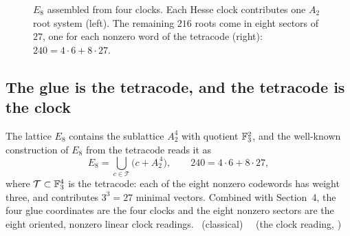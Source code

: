 \begin{figure}[htbp]
\centering
{}
\caption{$E_8$ assembled from four clocks. Each Hesse clock contributes one $A_2$ root
system (left). The remaining $216$ roots come in eight sectors of $27$, one for each
nonzero word of the tetracode (right): $240=4\cdot6+8\cdot27$.}
\label{fig:a24}
\end{figure}

\subsection{The glue is the tetracode, and the tetracode is the clock}

The lattice $E_8$ contains the sublattice $A_2^4$ with quotient $\mathbb{F}_3^2$, and the
well-known construction of $E_8$ from the tetracode \cite{ConwaySloane} reads it as
\[
E_8=\bigcup_{c\in\mathcal{T}}\bigl(c+A_2^{\,4}\bigr),\qquad
240=4\cdot6+8\cdot27 ,
\]
where $\mathcal{T}\subset\mathbb{F}_3^4$ is the tetracode: each of the eight nonzero codewords has
weight three, and contributes $3^3=27$ minimal vectors. Combined with Section~4, the
four glue coordinates are the four clocks and the eight nonzero sectors are the eight
oriented, nonzero linear clock readings. \tierT\ (classical) \ \tierC\ (the clock reading,
)

